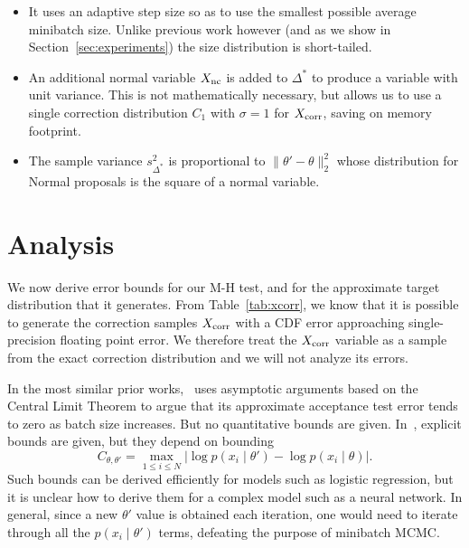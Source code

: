 \documentclass{article}
\begin{document}
\begin{itemize}
    \item It uses an adaptive step size so as to use the smallest possible
    average minibatch size. Unlike previous work however (and as we show in
    Section~\ref{sec:experiments}) the size distribution is short-tailed.

    \item An additional normal variable $X_{\rm nc}$ is added to $\Delta^*$ to
    produce a variable with unit variance. This is not mathematically necessary,
    but allows us to use a single correction distribution $C_1$ with $\sigma=1$
    for $X_{\rm corr}$, saving on memory footprint.

    \item The sample variance $s^2_{\Delta^*}$ is proportional to
    $\|\theta'-\theta\|_2^2$ whose distribution for Normal proposals is the
    square of a normal variable. 
\end{itemize}



\section{Analysis}\label{sec:analysis}

We now derive error bounds for our M-H test, and for the approximate target
distribution that it generates. From Table~\ref{tab:xcorr}, we know that
it is possible to generate the correction samples $X_{\rm corr}$ with a CDF
error approaching single-precision floating point error. We therefore treat the
$X_{\rm corr}$ variable as a sample from the exact correction distribution and
we will not analyze its errors.

In the most similar prior works,~\cite{cutting_mh_2014} uses asymptotic
arguments based on the Central Limit Theorem to argue that its approximate
acceptance test error tends to zero as batch size increases. But no quantitative
bounds are given. In~\cite{icml2014c1_bardenet14}, explicit bounds are given,
but they depend on bounding
\begin{equation}\label{eq:bad_bound}
    C_{\theta, \theta'} = \max_{1\leq i\leq N}|\log p(x_i\mid\theta') - \log p(x_i\mid\theta)|.
\end{equation}
Such bounds can be derived efficiently for models such as logistic regression,
but it is unclear how to derive them for a complex model such as a neural
network. In general, since a new $\theta'$ value is obtained each iteration, one
would need to iterate through all the $p(x_i\mid \theta')$ terms, defeating the
purpose of minibatch MCMC.
\end{document}
